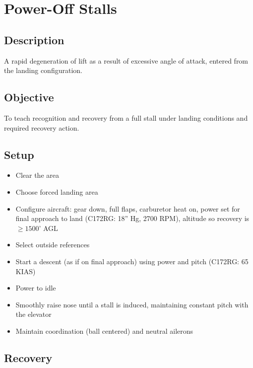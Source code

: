 \section{Power-Off Stalls}

\subsection{Description}

A rapid degeneration of lift as a result of excessive angle of attack, entered
from the landing configuration.

\subsection{Objective}

To teach recognition and recovery from a full stall under landing conditions
and required recovery action.

\subsection{Setup}

\begin{itemize}
  \item Clear the area
  \item Choose forced landing area
  \item Configure aircraft: gear down, full flaps, carburetor heat on, power
    set for final approach to land (C172RG: 18'' Hg, 2700 RPM), altitude so
    recovery is $\geq 1500$' AGL
  \item Select outside references
  \item Start a descent (as if on final approach) using power and pitch
    (C172RG: 65 KIAS) 
  \item Power to idle
  \item Smoothly raise nose until a stall is induced, maintaining constant
    pitch with the elevator
  \item Maintain coordination (ball centered) and neutral ailerons
\end{itemize}

\subsection{Recovery}

